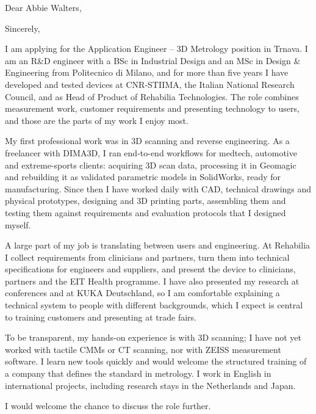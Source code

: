 \documentclass[11pt,a4paper,sans]{moderncv}
\begin{document}

\opening{Dear Abbie Walters,}
\closing{Sincerely,}
\makelettertitle

I am applying for the Application Engineer -- 3D Metrology position in Trnava. I am an R\&D engineer with a BSc in Industrial Design and an MSc in Design \& Engineering from Politecnico di Milano, and for more than five years I have developed and tested devices at CNR-STIIMA, the Italian National Research Council, and as Head of Product of Rehabilia Technologies. The role combines measurement work, customer requirements and presenting technology to users, and those are the parts of my work I enjoy most.

My first professional work was in 3D scanning and reverse engineering. As a freelancer with DIMA3D, I ran end-to-end workflows for medtech, automotive and extreme-sports clients: acquiring 3D scan data, processing it in Geomagic and rebuilding it as validated parametric models in SolidWorks, ready for manufacturing. Since then I have worked daily with CAD, technical drawings and physical prototypes, designing and 3D printing parts, assembling them and testing them against requirements and evaluation protocols that I designed myself.

A large part of my job is translating between users and engineering. At Rehabilia I collect requirements from clinicians and partners, turn them into technical specifications for engineers and suppliers, and present the device to clinicians, partners and the EIT Health programme. I have also presented my research at conferences and at KUKA Deutschland, so I am comfortable explaining a technical system to people with different backgrounds, which I expect is central to training customers and presenting at trade fairs.

To be transparent, my hands-on experience is with 3D scanning; I have not yet worked with tactile CMMs or CT scanning, nor with ZEISS measurement software. I learn new tools quickly and would welcome the structured training of a company that defines the standard in metrology. I work in English in international projects, including research stays in the Netherlands and Japan.

I would welcome the chance to discuss the role further.

\makeletterclosing
\end{document}
